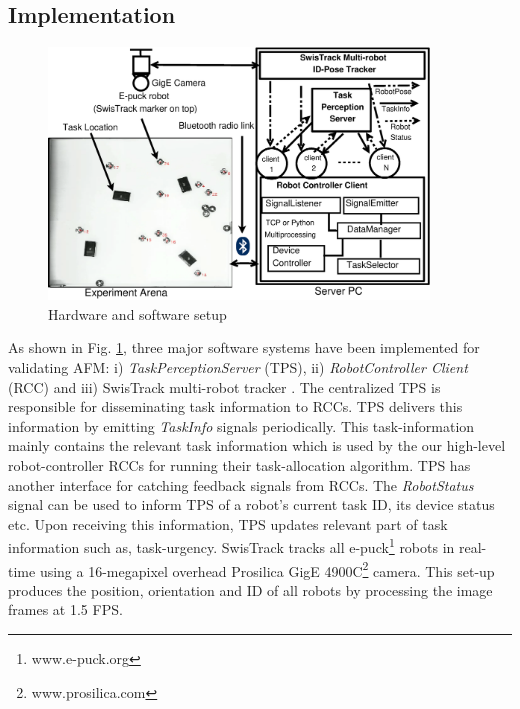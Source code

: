 \documentclass[smallcondensed]{svjour3}
\begin{document}
\subsection{Implementation}
\label{sec:impl}
\begin{figure}
\centering
\includegraphics[width=0.9\textwidth, angle=0]
{./RIL-Expt-Setup1.eps}
\caption{\small Hardware and software setup}
\label{fig:setup} %
\end{figure}
As shown in Fig. \ref{fig:setup}, three major software systems have been implemented for validating AFM: i) \textit{TaskPerceptionServer} (TPS), ii) \textit{RobotController Client} (RCC) and iii) SwisTrack multi-robot tracker \citep{Lochmatter+2008}. The centralized TPS is responsible for disseminating task information to RCCs. TPS delivers this information by emitting \textit{TaskInfo} signals periodically. This task-information mainly contains the relevant task information which is used by the our high-level robot-controller RCCs for running their task-allocation algorithm. TPS has another interface for catching feedback signals from RCCs. The \textit{RobotStatus} signal can be used to inform TPS of a robot's current task ID, its device status etc. Upon  receiving this information, TPS updates relevant part of task information such as, task-urgency.  SwisTrack  tracks all e-puck\footnote{www.e-puck.org} robots in real-time using a 16-megapixel overhead Prosilica GigE 4900C\footnote{www.prosilica.com}  camera. This set-up produces the position, orientation and ID of all  robots by processing the image frames at 1.5 FPS.  
\end{document}
